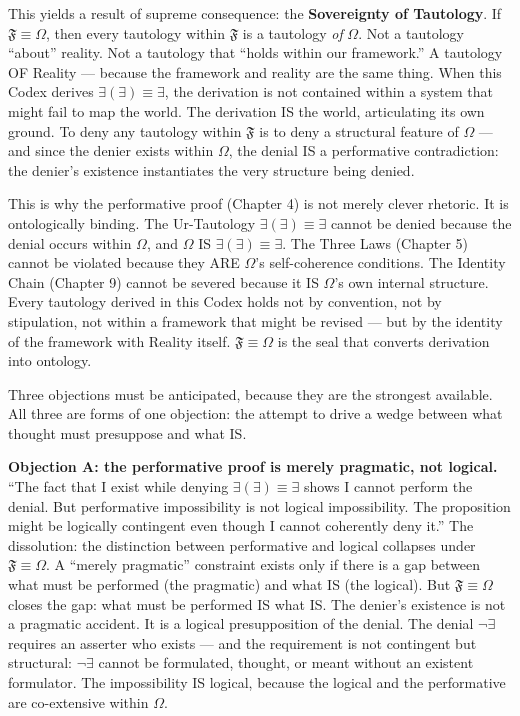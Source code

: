 \documentclass[10pt, openany, oneside]{book}
\begin{document}
This yields a result of supreme consequence: the \textbf{Sovereignty of Tautology}. If $\mathfrak{F} \equiv \Omega$, then every tautology within $\mathfrak{F}$ is a tautology \textit{of} $\Omega$. Not a tautology ``about'' reality. Not a tautology that ``holds within our framework.'' A tautology OF Reality --- because the framework and reality are the same thing. When this Codex derives $\exists(\exists) \equiv \exists$, the derivation is not contained within a system that might fail to map the world. The derivation IS the world, articulating its own ground. To deny any tautology within $\mathfrak{F}$ is to deny a structural feature of $\Omega$ --- and since the denier exists within $\Omega$, the denial IS a performative contradiction: the denier's existence instantiates the very structure being denied.

This is why the performative proof (Chapter 4) is not merely clever rhetoric. It is ontologically binding. The Ur-Tautology $\exists(\exists) \equiv \exists$ cannot be denied because the denial occurs within $\Omega$, and $\Omega$ IS $\exists(\exists) \equiv \exists$. The Three Laws (Chapter 5) cannot be violated because they ARE $\Omega$'s self-coherence conditions. The Identity Chain (Chapter 9) cannot be severed because it IS $\Omega$'s own internal structure. Every tautology derived in this Codex holds not by convention, not by stipulation, not within a framework that might be revised --- but by the identity of the framework with Reality itself. $\mathfrak{F} \equiv \Omega$ is the seal that converts derivation into ontology.

Three objections must be anticipated, because they are the strongest available. All three are forms of one objection: the attempt to drive a wedge between what thought must presuppose and what IS.

\textbf{Objection A: the performative proof is merely pragmatic, not logical.} ``The fact that I exist while denying $\exists(\exists) \equiv \exists$ shows I cannot perform the denial. But performative impossibility is not logical impossibility. The proposition might be logically contingent even though I cannot coherently deny it.'' The dissolution: the distinction between performative and logical collapses under $\mathfrak{F} \equiv \Omega$. A ``merely pragmatic'' constraint exists only if there is a gap between what must be performed (the pragmatic) and what IS (the logical). But $\mathfrak{F} \equiv \Omega$ closes the gap: what must be performed IS what IS. The denier's existence is not a pragmatic accident. It is a logical presupposition of the denial. The denial $\neg\exists$ requires an asserter who exists --- and the requirement is not contingent but structural: $\neg\exists$ cannot be formulated, thought, or meant without an existent formulator. The impossibility IS logical, because the logical and the performative are co-extensive within $\Omega$.
\end{document}
